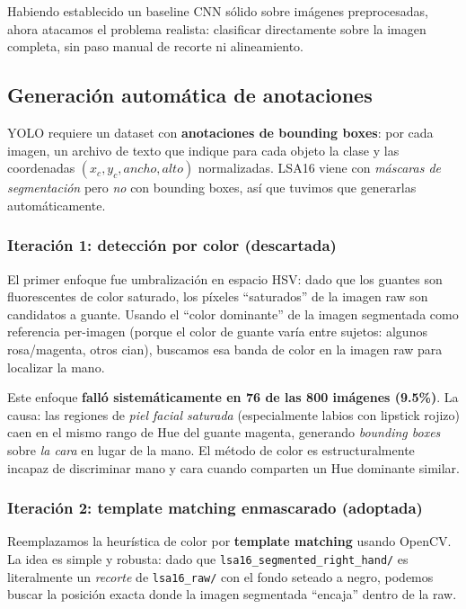 \documentclass[a4paper,11pt]{article}
\begin{document}
Habiendo establecido un baseline CNN sólido sobre imágenes preprocesadas, ahora atacamos el problema realista: clasificar directamente sobre la imagen completa, sin paso manual de recorte ni alineamiento.

\subsection{Generación automática de anotaciones}

YOLO requiere un dataset con \textbf{anotaciones de bounding boxes}: por cada imagen, un archivo de texto que indique para cada objeto la clase y las coordenadas $(x_c, y_c, ancho, alto)$ normalizadas. LSA16 viene con \emph{máscaras de segmentación} pero \emph{no} con bounding boxes, así que tuvimos que generarlas automáticamente.

\subsubsection{Iteración 1: detección por color (descartada)}

El primer enfoque fue umbralización en espacio HSV: dado que los guantes son fluorescentes de color saturado, los píxeles ``saturados'' de la imagen raw son candidatos a guante. Usando el ``color dominante'' de la imagen segmentada como referencia per-imagen (porque el color de guante varía entre sujetos: algunos rosa/magenta, otros cian), buscamos esa banda de color en la imagen raw para localizar la mano.

Este enfoque \textbf{falló sistemáticamente en 76 de las 800 imágenes (9.5\%)}. La causa: las regiones de \emph{piel facial saturada} (especialmente labios con lipstick rojizo) caen en el mismo rango de Hue del guante magenta, generando \textit{bounding boxes} sobre \emph{la cara} en lugar de la mano. El método de color es estructuralmente incapaz de discriminar mano y cara cuando comparten un Hue dominante similar.

\subsubsection{Iteración 2: template matching enmascarado (adoptada)}

Reemplazamos la heurística de color por \textbf{template matching} usando OpenCV. La idea es simple y robusta: dado que \texttt{lsa16\_segmented\_right\_hand/} es literalmente un \emph{recorte} de \texttt{lsa16\_raw/} con el fondo seteado a negro, podemos buscar la posición exacta donde la imagen segmentada ``encaja'' dentro de la raw.
\end{document}

